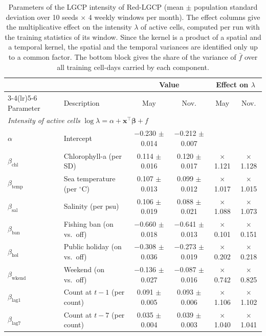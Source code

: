 \begin{table}[t]
\centering
\caption{Parameters of the LGCP intensity of Red-LGCP (mean $\pm$ population standard deviation over 10 seeds $\times$ 4 weekly windows per month). The effect columns give the multiplicative effect on the intensity $\lambda$ of active cells, computed per run with the training statistics of its window. Since the kernel is a product of a spatial and a temporal kernel, the spatial and the temporal variances are identified only up to a common factor. The bottom block gives the share of the variance of $\bar f$ over all training cell-days carried by each component.}
\label{tab:lgcp_params}
\vspace{2pt}
\small
\setlength{\tabcolsep}{4pt}
\begin{tabular}{llcccc}
\toprule
 & & \multicolumn{2}{c}{Value} & \multicolumn{2}{c}{Effect on $\lambda$} \\
\cmidrule(lr){3-4}\cmidrule(lr){5-6}
Parameter & Description & May & Nov. & May & Nov. \\
\midrule
\multicolumn{6}{l}{\textit{Intensity of active cells} $\log\lambda=\alpha+\mathbf{x}^\top\boldsymbol{\beta}+f$} \\
$\alpha$ & Intercept & $-$0.230 $\pm$ 0.014 & $-$0.212 $\pm$ 0.007 &  &  \\
$\beta_{\mathrm{chl}}$ & Chlorophyll-a (per SD) & 0.114 $\pm$ 0.016 & 0.120 $\pm$ 0.017 & $\times$1.121 & $\times$1.128 \\
$\beta_{\mathrm{temp}}$ & Sea temperature (per $^\circ$C) & 0.107 $\pm$ 0.013 & 0.099 $\pm$ 0.012 & $\times$1.017 & $\times$1.015 \\
$\beta_{\mathrm{sal}}$ & Salinity (per psu) & 0.106 $\pm$ 0.019 & 0.088 $\pm$ 0.021 & $\times$1.088 & $\times$1.073 \\
$\beta_{\mathrm{ban}}$ & Fishing ban (on vs.\ off) & $-$0.660 $\pm$ 0.018 & $-$0.641 $\pm$ 0.013 & $\times$0.101 & $\times$0.151 \\
$\beta_{\mathrm{hol}}$ & Public holiday (on vs.\ off) & $-$0.308 $\pm$ 0.036 & $-$0.273 $\pm$ 0.019 & $\times$0.202 & $\times$0.218 \\
$\beta_{\mathrm{wkend}}$ & Weekend (on vs.\ off) & $-$0.136 $\pm$ 0.027 & $-$0.087 $\pm$ 0.016 & $\times$0.742 & $\times$0.825 \\
$\beta_{\mathrm{lag1}}$ & Count at $t-1$ (per count) & 0.091 $\pm$ 0.005 & 0.093 $\pm$ 0.006 & $\times$1.106 & $\times$1.102 \\
$\beta_{\mathrm{lag7}}$ & Count at $t-7$ (per count) & 0.035 $\pm$ 0.004 & 0.039 $\pm$ 0.003 & $\times$1.040 & $\times$1.041 \\

\end{tabular}
\end{table}
